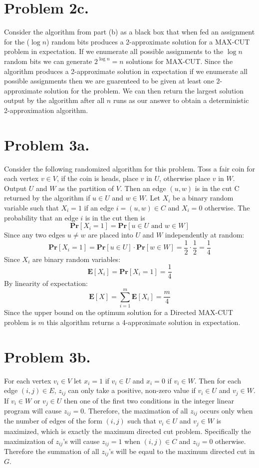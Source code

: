 \documentclass[12pt]{article}
\begin{document}
\section*{Problem 2c.}
Consider the algorithm from part (b) as a black box that when fed an
assignment for the ($\log n$) random bits produces a 2-approximate solution for
a MAX-CUT problem in expectation. If we enumerate all possible assignments to
the $\log n$ random bits we can generate $2^{\log n} = n$ solutions for MAX-CUT.
Since the algorithm produces a 2-approximate solution in expectation if we
enumerate all possible assignments then we are guarenteed to be given at least
one 2-approximate solution for the problem. We can then return the largest
solution output by the algorithm after all $n$ runs as our answer to obtain a
deterministic 2-approximation algorithm.

\section*{Problem 3a.}

Consider the following randomized algorithm for this problem. Toss a fair coin
for each vertex $v\in V$, if the coin is heads, place $v$ in $U$, otherwise
place $v$ in $W$. Output $U$ and $W$ as the partition of $V$. Then an edge
$(u,w)$ is in the cut C returned by the algorithm if $u\in U$ and $w \in W$.
Let $X_i$ be a binary random variable such that $X_i = 1$ if an edge
$i = (u,w) \in C$ and $X_i = 0$ otherwise. The probability that an edge $i$
is in the cut then is
$$\textbf{Pr}[X_i = 1] = \textbf{Pr}[u \in U \text{ and } w\in W]$$
Since any two edges $u \neq w$ are placed into $U$ and $W$ independently at
random: $$\textbf{Pr}[X_i = 1] = \textbf{Pr}[u \in U]\cdot\textbf{Pr}[w\in W] =
\frac{1}{2}\cdot\frac{1}{2} = \frac{1}{4}$$
Since $X_i$ are binary random variables:
$$\textbf{E}[X_i] = \textbf{Pr}[X_i = 1] = \frac{1}{4}$$
By linearity of expectation:
$$\textbf{E}[X] = \sum^m_{i=1} \textbf{E}[X_i] = \frac{m}{4}$$
Since the upper bound on the optimum solution for a Directed MAX-CUT problem is
$m$ this algorithm returns a 4-approximate solution in expectation.

\section*{Problem 3b.}
For each vertex $v_i \in V$ let $x_i = 1$ if $v_i \in U$ and $x_i = 0$ if
$v_i \in W$. Then for each edge $(i,j) \in E$, $z_{ij}$ can only take a positive,
non-zero value if $v_i \in U$ and $v_j \in W$. If $v_i \in W$ or $v_j \in U$
then one of the first two conditions in the integer linear program will cause
$z_{ij} = 0$. Therefore, the maximation of all $z_{ij}$ occurs only when the number
of edges of the form $(i,j)$ such that $v_i \in U$ and $v_j \in W$ is maximized,
which is exactly the maximum directed cut problem. Specifically the maximization
of $z_{ij}$'s will cause $z_{ij} = 1$ when $(i,j) \in C$ and $z_{ij} = 0$
otherwise. Therefore the summation of all $z_{ij}$'s will be eqaul to the
maximum directed cut in $G$.
\end{document}
